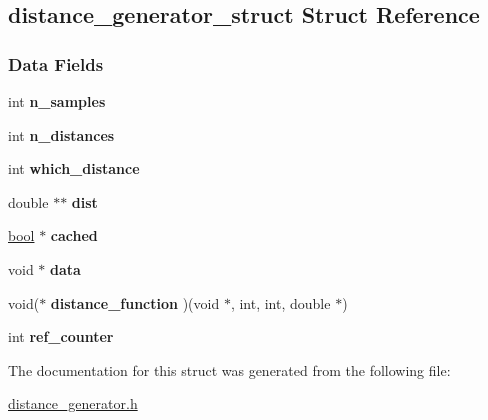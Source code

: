\hypertarget{structdistance__generator__struct}{}\subsection{distance\+\_\+generator\+\_\+struct Struct Reference}
\label{structdistance__generator__struct}
\subsubsection*{Data Fields}
\begin{DoxyCompactItemize}
\item 
\mbox{\label{structdistance__generator__struct_a40ab17259fd3a8a71223bfdd2565fb12}} 
int {\bfseries n\+\_\+samples}
\item 
\mbox{\label{structdistance__generator__struct_a0f63e5c55720dd720c5ab9dc73eefa45}} 
int {\bfseries n\+\_\+distances}
\item 
\mbox{\label{structdistance__generator__struct_a755670e899726cb296204c9c3155e057}} 
int {\bfseries which\+\_\+distance}
\item 
\mbox{\label{structdistance__generator__struct_a20d4dd33cd506d23fc48358b2f49b9ef}} 
double $\ast$$\ast$ {\bfseries dist}
\item 
\mbox{\label{structdistance__generator__struct_a9c0c2c68ad2c5e8e6a7b09287ca4d2a6}} 
\hyperlink{lowlevel_8h_a97a80ca1602ebf2303258971a2c938e2}{bool} $\ast$ {\bfseries cached}
\item 
\mbox{\label{structdistance__generator__struct_a60c58e4cb9b4bd97dd7224fe4a041caa}} 
void $\ast$ {\bfseries data}
\item 
\mbox{\label{structdistance__generator__struct_a768920a3761b8cd9d73f9138e9d6b6df}} 
void($\ast$ {\bfseries distance\+\_\+function} )(void $\ast$, int, int, double $\ast$)
\item 
\mbox{\label{structdistance__generator__struct_a6e798b277782dd6de11b74a5eda40650}} 
int {\bfseries ref\+\_\+counter}
\end{DoxyCompactItemize}


The documentation for this struct was generated from the following file\+:\begin{DoxyCompactItemize}
\item 
\hyperlink{distance__generator_8h}{distance\+\_\+generator.\+h}\end{DoxyCompactItemize}
